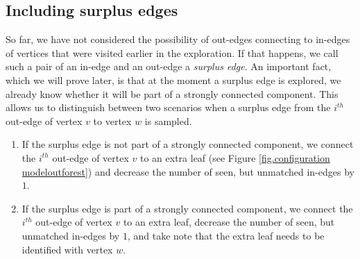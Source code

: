  \subsection{Including surplus edges}
So far, we have not considered the possibility of out-edges connecting to in-edges of vertices that were visited earlier in the exploration. If that happens, we call such a pair of an in-edge and an out-edge a \emph{surplus edge}. An important fact, which we will prove later, is that at the moment a surplus edge is explored, we already know whether it will be part of a strongly connected component. This allows us to distinguish between two scenarios when a surplus edge from the $i^{th}$ out-edge of vertex $v$ to vertex $w$ is sampled.
\begin{enumerate}
    \item If the surplus edge is not part of a strongly connected component, we connect the $i^{th}$ out-edge of vertex $v$ to an extra leaf (see Figure \ref{fig.configuration modeloutforest}) and decrease the number of seen, but unmatched in-edges by $1$.
    \item If the surplus edge is part of a strongly connected component, we connect the $i^{th}$ out-edge of vertex $v$ to an extra leaf, decrease the number of seen, but unmatched in-edges by $1$, and take note that the extra leaf needs to be identified with vertex $w$. 
\end{enumerate}

